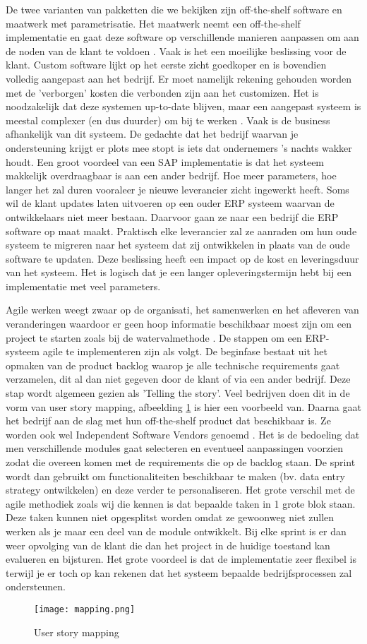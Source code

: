 De twee varianten van pakketten die we bekijken zijn off-the-shelf software en maatwerk met parametrisatie. Het maatwerk neemt een off-the-shelf implementatie en gaat deze software op verschillende manieren aanpassen om aan de noden van de klant te voldoen \autocite{Vollmer2016}. Vaak is het een moeilijke beslissing voor de klant. Custom software lijkt op het eerste zicht goedkoper en is bovendien volledig aangepast aan het bedrijf. Er moet namelijk rekening gehouden worden met de 'verborgen' kosten die verbonden zijn aan het customizen. Het is noodzakelijk dat deze systemen up-to-date blijven, maar een aangepast systeem is meestal complexer (en dus duurder) om bij te werken \autocite{Bdc2019}. Vaak is de business afhankelijk van dit systeem. De gedachte dat het bedrijf waarvan je ondersteuning krijgt er plots mee stopt is iets dat ondernemers 's nachts wakker houdt. Een groot voordeel van een SAP implementatie is dat het systeem makkelijk overdraagbaar is aan een ander bedrijf. Hoe meer parameters, hoe langer het zal duren vooraleer je nieuwe leverancier zicht ingewerkt heeft. Soms wil de klant updates laten uitvoeren op een ouder ERP systeem waarvan de ontwikkelaars niet meer bestaan. Daarvoor gaan ze naar een bedrijf die ERP software op maat maakt. Praktisch elke leverancier zal ze aanraden om hun oude systeem te migreren naar het systeem dat zij ontwikkelen in plaats van de oude software te updaten. Deze beslissing heeft een impact op de kost en leveringsduur van het systeem. Het is logisch dat je een langer opleveringstermijn hebt bij een implementatie met veel parameters.

Agile werken weegt zwaar op de organisati, het samenwerken en het afleveren van veranderingen waardoor er geen hoop informatie beschikbaar moest zijn om een project te starten zoals bij de watervalmethode \autocite{Mrpeasy2018}. De stappen om een ERP-systeem agile te implementeren zijn als volgt. De beginfase bestaat uit het opmaken van de product backlog waarop je alle technische requirements gaat verzamelen, dit al dan niet gegeven door de klant of via een ander bedrijf. Deze stap wordt algemeen gezien als 'Telling the story'. Veel bedrijven doen dit in de vorm van user story mapping, afbeelding \ref{fig:mapping} is hier een voorbeeld van. Daarna gaat het bedrijf aan de slag met hun off-the-shelf product dat beschikbaar is. Ze worden ook wel Independent Software Vendors genoemd \autocite{Mrpeasy2018}. Het is de bedoeling dat men verschillende modules gaat selecteren en eventueel aanpassingen voorzien zodat die overeen komen met de requirements die op de backlog staan. De sprint wordt dan gebruikt om functionaliteiten beschikbaar te maken (bv. data entry strategy ontwikkelen) en deze verder te personaliseren. Het grote verschil met de agile methodiek zoals wij die kennen is dat bepaalde taken in 1 grote blok staan. Deze taken kunnen niet opgesplitst worden omdat ze gewoonweg niet zullen werken als je maar een deel van de module ontwikkelt. Bij elke sprint is er dan weer opvolging van de klant die dan het project in de huidige toestand kan evalueren en bijsturen. Het grote voordeel is dat de implementatie zeer flexibel is terwijl je er toch op kan rekenen dat het systeem bepaalde bedrijfsprocessen zal ondersteunen.

\begin{figure}[b!]
    \texttt{[image: mapping.png]}
    \caption{User story mapping}
    \label{fig:mapping}
\end{figure}